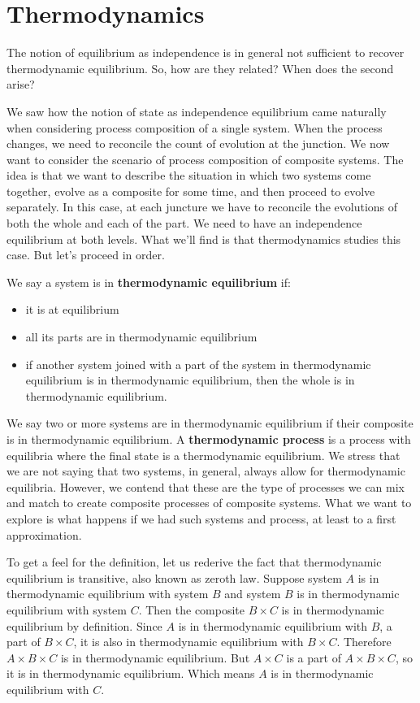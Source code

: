 \documentclass[letterpaper,twocolumn]{article}
\begin{document}
\section{Thermodynamics}

The notion of equilibrium as independence is in general not sufficient to recover thermodynamic equilibrium. So, how are they related? When does the second arise?

We saw how the notion of state as independence equilibrium came naturally when considering process composition of a single system. When the process changes, we need to reconcile the count of evolution at the junction. We now want to consider the scenario of process composition of composite systems. The idea is that we want to describe the situation in which two systems come together, evolve as a composite for some time, and then proceed to evolve separately. In this case, at each juncture we have to reconcile the evolutions of both the whole and each of the part. We need to have an independence equilibrium at both levels. What we'll find is that thermodynamics studies this case. But let's proceed in order.

We say a system is in \textbf{thermodynamic equilibrium} if:
\begin{itemize}
	\item it is at equilibrium
	\item all its parts are in thermodynamic equilibrium
	\item if another system joined with a part of the system in thermodynamic equilibrium is in thermodynamic equilibrium, then the whole is in thermodynamic equilibrium.
\end{itemize}
We say two or more systems are in thermodynamic equilibrium if their composite is in thermodynamic equilibrium. A \textbf{thermodynamic process} is a process with equilibria where the final state is a thermodynamic equilibrium. We stress that we are not saying that two systems, in general, always allow for thermodynamic equilibria. However, we contend that these are the type of processes we can mix and match to create composite processes of composite systems. What we want to explore is what happens if we had such systems and process, at least to a first approximation.

To get a feel for the definition, let us rederive the fact that thermodynamic equilibrium is transitive, also known as zeroth law. Suppose system $A$ is in thermodynamic equilibrium with system $B$ and system $B$ is in thermodynamic equilibrium with system $C$. Then the composite $B \times C$ is in thermodynamic equilibrium by definition. Since $A$ is in thermodynamic equilibrium with $B$, a part of $B \times C$, it is also in thermodynamic equilibrium with $B \times C$. Therefore $A \times B \times C$ is in thermodynamic equilibrium. But $A \times C$ is a part of $A \times B \times C$, so it is in thermodynamic equilibrium. Which means $A$ is in thermodynamic equilibrium with $C$.
\end{document}
